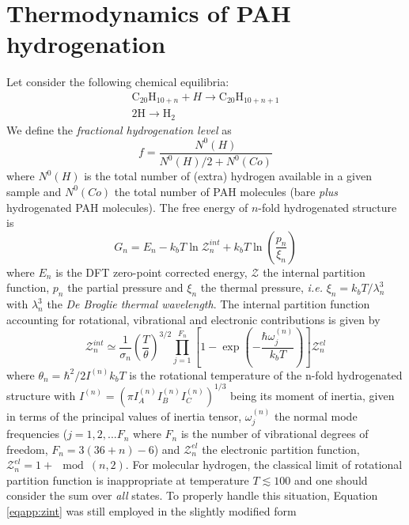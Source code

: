 \documentclass[a4paper, 11pt, twoside]{book}
\begin{document}
\chapter*{Thermodynamics of PAH hydrogenation}

Let consider the following chemical equilibria:
\begin{gather}
    \text{C}_{20}\text{H}_{10+n} + H \rightarrow \text{C}_{20}\text{H}_{10+n+1} \nonumber \\
    2\text{H} \rightarrow \text{H}_2 \nonumber
\end{gather}
We define the \emph{fractional hydrogenation level} as
\begin{equation}
    f=\frac{N^0(H)}{N^0(H)/2+N^0(Co)} 
\end{equation}
where $N^0(H)$ is the total number of (extra) hydrogen available in a given sample and $N^0(Co)$ the total number of PAH molecules (bare \emph{plus} hydrogenated PAH molecules).
The free energy of $n$-fold hydrogenated structure is
\begin{equation}
    G_{n} = E_n - k_bT \ln{\mathcal{Z}^{int}_n}+k_bT\ln{\left(\frac{p_n}{\xi_n}\right)} \nonumber
\end{equation}
where $E_n$ is the DFT zero-point corrected energy, $\mathcal{Z}$ the internal partition function, $p_n$ the partial pressure and $\xi_n$ the thermal pressure, \emph{i.e.} $\xi_n=k_bT/\lambda_n^3$with $\lambda_n^3$ the \emph{De Broglie thermal wavelength}. The internal partition function accounting for rotational, vibrational and electronic contributions is given by
\begin{equation}
    \mathcal{Z}^{int}_{n} \simeq \frac{1}{\sigma_n}\left( \frac{T}{\theta}\right)^{3/2}\prod_{j=1}^{F_n}\left[1-\exp\left(-\frac{\hbar\omega_j^{(n)}}{k_bT}\right)\right]\mathcal{Z}_{n}^{el}  \label{eqapp:zint}
\end{equation}
where $\theta_n=\hbar^2/2I^{(n)}k_bT$ is the rotational temperature of the n-fold hydrogenated structure with $I^{(n)} = (\pi I^{(n)}_AI^{(n)}_BI^{(n)}_C)^{1/3}$ being its moment of inertia, given in terms of the principal values of inertia tensor, $\omega^{(n)}_j$ the normal mode frequencies ($j=1,2,...F_n$ where $F_n$ is the number of vibrational degrees of freedom, $F_n=3(36+n)-6$) and $\mathcal{Z}^{el}_n$ the electronic partition function, $\mathcal{Z}^{el}_n = 1+\mod(n,2)$.
For molecular hydrogen, the classical limit of rotational partition function is inappropriate at temperature $T \lesssim 100$ and one should consider the sum over \emph{all} states. To properly handle this situation, Equation \eqref{eqapp:zint} was still employed in the slightly modified form
\end{document}
